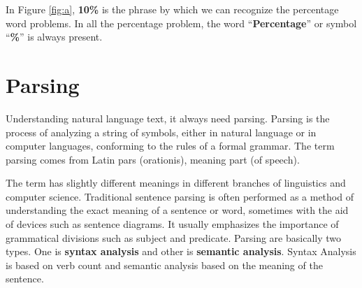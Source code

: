 \documentclass[document.tex]{subfiles}
\begin{document}
In Figure \ref{fig:a}, \textbf{10\%} is the phrase by which we can recognize the percentage word problems. In all the percentage problem, the word ``\textbf{Percentage}'' or symbol ``\textbf{\%}'' is always present.

\section{Parsing}
Understanding natural language text, it always need parsing. Parsing is the process of analyzing a string of symbols, either in natural language or in computer languages, conforming to the rules of a formal grammar. The term parsing comes from Latin pars (orationis), meaning part (of speech).

The term has slightly different meanings in different branches of linguistics and computer science. Traditional sentence parsing is often performed as a method of understanding the exact meaning of a sentence or word, sometimes with the aid of devices such as sentence diagrams. It usually emphasizes the importance of grammatical divisions such as subject and predicate.
Parsing are basically two types. One is \textbf{syntax analysis} and other is \textbf{semantic analysis}. Syntax Analysis is based on verb count and semantic analysis based on the meaning of the sentence.
\end{document}
